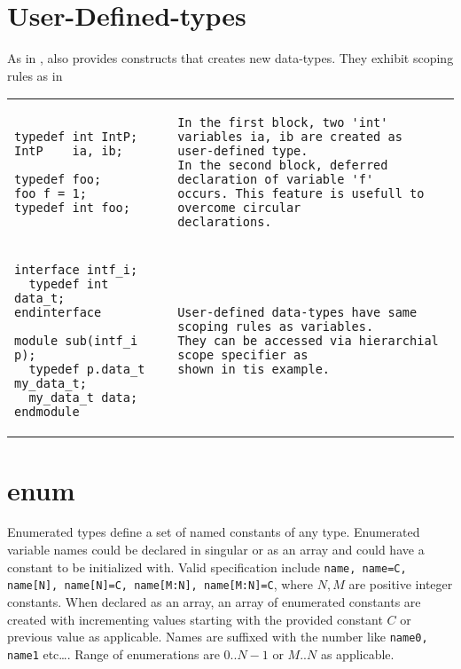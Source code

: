 \section{User-Defined-types}
As in \lc, \lvlog also provides \kwtypedef constructs that creates new
data-types. They exhibit scoping rules as in \lcpp 

\begin{table}
\begin{tabular}{p{} p{}}

\begin{Verbatim}
typedef int IntP;
IntP    ia, ib;

typedef foo;
foo f = 1;
typedef int foo;
\end{Verbatim}
&
\begin{tbldesc}
\begin{verbatim}
In the first block, two 'int' variables ia, ib are created as
user-defined type.
In the second block, deferred declaration of variable 'f'
occurs. This feature is usefull to overcome circular
declarations.
\end{verbatim}
\end{tbldesc}
\\
\begin{Verbatim}
interface intf_i;
  typedef int data_t;
endinterface

module sub(intf_i p);
  typedef p.data_t my_data_t;
  my_data_t data;
endmodule
\end{Verbatim}
&
\begin{tbldesc}
\begin{verbatim}
User-defined data-types have same scoping rules as variables.
They can be accessed via hierarchial scope specifier as
shown in tis example.
\end{verbatim}
\end{tbldesc}

\end{tabular}
\end{table}


\section{enum}
Enumerated types define a set of named constants of any
type. Enumerated variable names could be declared in singular or as an
array and could have a constant to be initialized with. Valid
specification include
\verb|name, name=C, name[N], name[N]=C, name[M:N], name[M:N]=C|, where
$N, M$ are positive integer constants. When declared as an array, an
array of enumerated constants are created with incrementing values
starting with the provided constant $C$ or previous value as
applicable. Names are suffixed with the number like
\verb|name0, name1| etc\ldots. Range of enumerations are $0..N-1$ or
$M..N$ as applicable.

